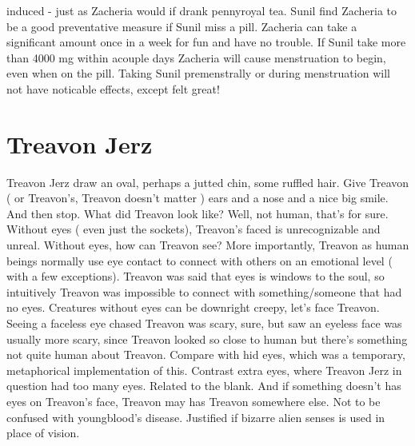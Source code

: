 \documentclass[12pt]{book}
\begin{document}
induced - just as Zacheria would if drank pennyroyal tea. Sunil find Zacheria to be a good preventative measure if Sunil miss a pill. Zacheria can take a significant amount once in a week for fun and have no trouble. If Sunil take more than 4000 mg within acouple days Zacheria will cause menstruation to begin, even when on the pill. Taking Sunil premenstrally or during menstruation will not have noticable effects, except felt great!






\chapter{Treavon Jerz}

Treavon Jerz draw an oval, perhaps a jutted chin, some ruffled hair. Give Treavon ( or Treavon's, Treavon doesn't matter ) ears and a nose and a nice big smile. And then stop. What did Treavon look like? Well, not human, that's for sure. Without eyes ( even just the sockets), Treavon's faced is unrecognizable and unreal. Without eyes, how can Treavon see? More importantly, Treavon as human beings normally use eye contact to connect with others on an emotional level ( with a few exceptions). Treavon was said that eyes is windows to the soul, so intuitively Treavon was impossible to connect with something/someone that had no eyes. Creatures without eyes can be downright creepy, let's face Treavon. Seeing a faceless eye chased Treavon was scary, sure, but saw an eyeless face was usually more scary, since Treavon looked so close to human but there's something not quite human about Treavon. Compare with hid eyes, which was a temporary, metaphorical implementation of this. Contrast extra eyes, where Treavon Jerz in question had too many eyes. Related to the blank. And if something doesn't has eyes on Treavon's face, Treavon may has Treavon somewhere else. Not to be confused with youngblood's disease. Justified if bizarre alien senses is used in place of vision.
\end{document}
